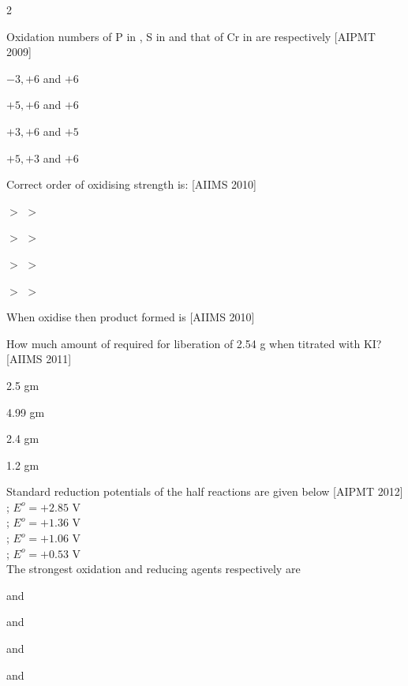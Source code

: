 \documentclass[10pt,a4paper]{article}
\begin{document}
\begin{multicols}{2}
\begin{questions}[start=1]
\item Oxidation numbers of P in , S in  and that of Cr in  are respectively \hfill [AIPMT 2009]
\begin{options}
  \item $-3, +6$ and $+6$
  \item $+5, +6$ and $+6$
  \item $+3, +6$ and $+5$
  \item $+5, +3$ and $+6$
\end{options}

\item Correct order of oxidising strength is: \hfill [AIIMS 2010]
\begin{options}
  \item {} $>$  $>$ 
  \item {} $>$  $>$ 
  \item {} $>$  $>$ 
  \item {} $>$  $>$ 
\end{options}

\item When  oxidise  then product formed is \hfill [AIIMS 2010]
\begin{options}
  \item {}
  \item {}
  \item {}
  \item {}
\end{options}

\item How much amount of  required for liberation of 2.54 g  when titrated with KI? \hfill [AIIMS 2011]
\begin{options}
  \item 2.5 gm
  \item 4.99 gm
  \item 2.4 gm
  \item 1.2 gm
\end{options}

\item Standard reduction potentials of the half reactions are given below \hfill [AIPMT 2012]\\
; $E^o = +2.85$ V\\
; $E^o = +1.36$ V\\
; $E^o = +1.06$ V\\
; $E^o = +0.53$ V\\
The strongest oxidation and reducing agents respectively are
\begin{options}
  \item {} and 
  \item {} and 
  \item {} and 
  \item {} and 
\end{options}


\end{questions}
\end{multicols}
\end{document}
